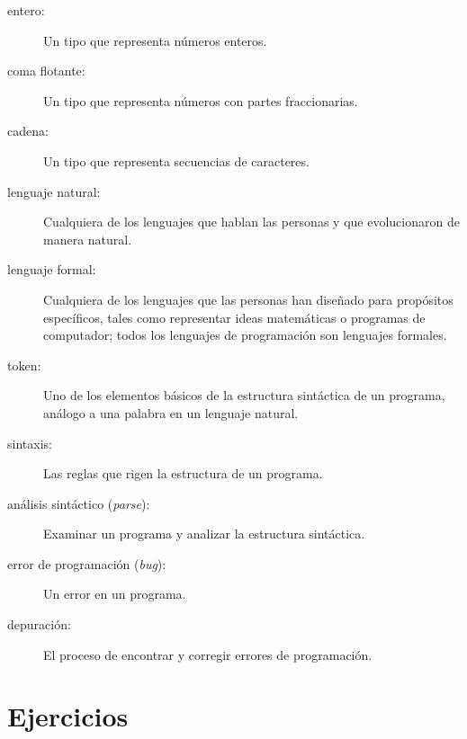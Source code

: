 \documentclass[10pt]{book}
\begin{document}
\begin{description}
\item[entero:] Un tipo que representa números enteros.

\item[coma flotante:] Un tipo que representa números con partes
fraccionarias.

\item[cadena:] Un tipo que representa secuencias de caracteres.

\item[lenguaje natural:]  Cualquiera de los lenguajes que hablan las personas y
que evolucionaron de manera natural.

\item[lenguaje formal:]  Cualquiera de los lenguajes que las personas han diseñado
para propósitos específicos, tales como representar ideas matemáticas o
programas de computador; todos los lenguajes de programación son lenguajes formales.

\item[token:]  Uno de los elementos básicos de la estructura sintáctica de
un programa, análogo a una palabra en un lenguaje natural.

\item[sintaxis:] Las reglas que rigen la estructura de un programa.

\item[análisis sintáctico ({\em parse}):] Examinar un programa y analizar la
estructura sintáctica.

\item[error de programación ({\em bug}):] Un error en un programa.

\item[depuración:] El proceso de encontrar y corregir
errores de programación.

\end{description}


\section{Ejercicios}
\end{document}
